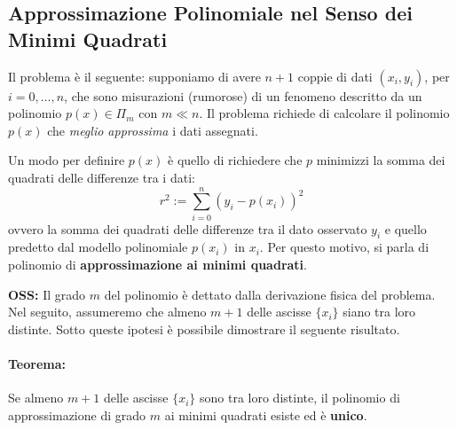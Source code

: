 \vspace{1cm}
\subsection{Approssimazione Polinomiale nel Senso dei Minimi Quadrati}

Il problema è il seguente: supponiamo di avere $n+1$ coppie di dati $(x_i, y_i)$, per $i=0, \dots, n$, che sono misurazioni (rumorose) di un fenomeno descritto da un polinomio $p(x) \in \Pi_m$ con $m \ll n$. 
Il problema richiede di calcolare il polinomio $p(x)$ che \textit{meglio approssima} i dati assegnati.

Un modo per definire $p(x)$ è quello di richiedere che $p$ minimizzi la somma dei quadrati delle differenze tra i dati:
\begin{equation} \label{eq:residuo_quadratico}
r^2 := \sum_{i=0}^{n} (y_i - p(x_i))^2
\end{equation}
ovvero la somma dei quadrati delle differenze tra il dato osservato $y_i$ e quello predetto dal modello polinomiale $p(x_i)$ in $x_i$. Per questo motivo, si parla di polinomio di \textbf{approssimazione ai minimi quadrati}.

\textbf{OSS:} Il grado $m$ del polinomio è dettato dalla derivazione fisica del problema. Nel seguito, assumeremo che almeno $m+1$ delle ascisse $\{x_i\}$ siano tra loro distinte. Sotto queste ipotesi è possibile dimostrare il seguente risultato.

\paragraph{Teorema:} Se almeno $m+1$ delle ascisse $\{x_i\}$ sono tra loro distinte, il polinomio di approssimazione di grado $m$ ai minimi quadrati esiste ed è \textbf{unico}.

